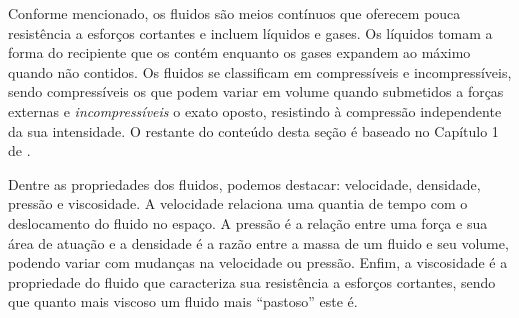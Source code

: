 \documentclass[12pt,a4paper,dvipsnames]{article}
\begin{document}
Conforme mencionado, os fluidos são meios contínuos que oferecem pouca resistência a esforços cortantes e incluem líquidos e gases. Os líquidos tomam a forma do recipiente que os contém enquanto os gases expandem ao máximo quando não contidos. Os fluidos se classificam em compressíveis e incompressíveis, sendo compressíveis os que podem variar em volume quando submetidos a forças externas e \textit{incompressíveis} o exato oposto, resistindo à compressão independente da sua intensidade. O restante do conteúdo desta seção é baseado no Capítulo 1 de \cite{kim_2017}.

Dentre as propriedades dos fluidos, podemos destacar: velocidade, densidade, pressão e viscosidade. A velocidade relaciona uma quantia de tempo com o deslocamento do fluido no espaço. A pressão é a relação entre uma força e sua área de atuação e a densidade é a razão entre a massa de um fluido e seu volume, podendo variar com mudanças na velocidade ou pressão. Enfim, a viscosidade é a propriedade do fluido que caracteriza sua resistência a esforços cortantes, sendo que quanto mais viscoso um fluido mais ``pastoso'' este é.
\end{document}
